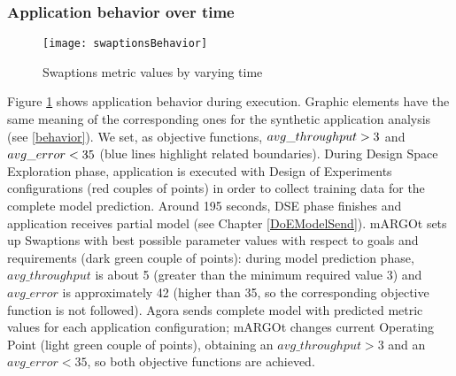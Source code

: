 \subsubsection{Application behavior over time}

\begin{figure}[htb]

    \centering
    
    \texttt{[image: swaptionsBehavior]}
    
    \caption{Swaptions metric values by varying time}
    
    \label{fig::sw::beh}
    
\end{figure}

Figure \ref{fig::sw::beh} shows application behavior during execution. Graphic elements have the same meaning of the corresponding ones for the synthetic application analysis (see \ref{behavior}). We set, as objective functions, $avg\_\-throughput > 3$ and $avg\_\-error < 35$ (blue lines highlight related boundaries). During Design Space Exploration phase, application is executed with Design of Experiments configurations (red couples of points) in order to collect training data for the complete model prediction. Around 195 seconds, DSE phase finishes and application receives partial model (see Chapter \ref{DoEModelSend}). mARGOt sets up Swaptions with best possible parameter values with respect to goals and requirements (dark green couple of points): during model prediction phase, $avg\_throughput$ is about 5 (great\-er than the minimum required value 3) and $avg\_error$ is approximately 42 (higher than 35, so the corresponding objective function is not followed). Agora sends complete model with predicted metric values for each application configuration; mARGOt changes current Operating Point (light green couple of points), obtaining an $avg\_throughput > 3$ and an $avg\_error < 35$, so both objective functions are achieved. 
